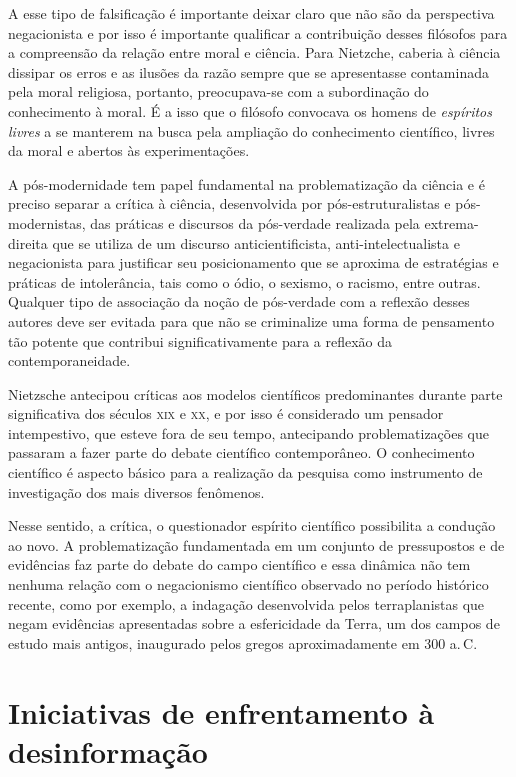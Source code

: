 A esse tipo de falsificação é importante deixar claro que não
são da perspectiva negacionista e por isso é importante qualificar a
contribuição desses filósofos para a compreensão da relação entre moral
e ciência. Para Nietzche, caberia à ciência dissipar os erros e as
ilusões da razão sempre que se apresentasse contaminada pela moral
religiosa, portanto, preocupava-se com a subordinação do conhecimento à
moral. É a isso que o filósofo convocava os homens de \textit{espíritos
livres} a se manterem na busca pela ampliação do conhecimento
científico, livres da moral e abertos às experimentações.

A pós-modernidade tem papel fundamental na problematização da ciência e
é preciso separar a crítica à ciência, desenvolvida por
pós-estruturalistas e pós-modernistas, das práticas e discursos da
pós-verdade realizada pela extrema-direita que se utiliza de um discurso
anticientificista, anti-intelectualista e negacionista para justificar
seu posicionamento que se aproxima de estratégias e práticas de
intolerância, tais como o ódio, o sexismo, o racismo, entre outras.
Qualquer tipo de associação da noção de pós-verdade com a reflexão
desses autores deve ser evitada para que não se criminalize uma forma de
pensamento tão potente que contribui significativamente para a reflexão
da contemporaneidade.

Nietzsche antecipou críticas aos modelos científicos
predominantes durante parte significativa dos séculos \textsc{xix} e \textsc{xx}, e por
isso é considerado um pensador intempestivo, que esteve fora de seu
tempo, antecipando problematizações que passaram a fazer parte do debate
científico contemporâneo. O conhecimento científico é aspecto básico
para a realização da pesquisa como instrumento de investigação dos mais
diversos fenômenos.

Nesse sentido, a crítica, o questionador espírito científico
possibilita a condução ao novo. A problematização fundamentada em um
conjunto de pressupostos e de evidências faz parte do debate do campo
científico e essa dinâmica não tem nenhuma relação com o negacionismo
científico observado no período histórico recente, como por exemplo, a
indagação desenvolvida pelos terraplanistas que negam evidências
apresentadas sobre a esfericidade da Terra, um dos campos de estudo mais
antigos, inaugurado pelos gregos aproximadamente em 300 a.\,C.

\section{Iniciativas de enfrentamento à desinformação}

